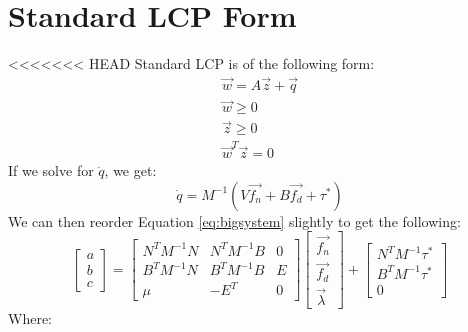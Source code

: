 \section{Standard LCP Form}
<<<<<<< HEAD
Standard LCP is of the following form:
\begin{equation}
\begin{array}{cc}
\vec{w} = A\vec{z} + \vec{q} \\
\vec{w} \geq 0 \\
\vec{z} \geq 0 \\
\vec{w}^T\vec{z} = 0
\end{array}
\end{equation}
If we solve for $\dot{q}$, we get:
\begin{equation}
\dot{q} = M^{-1}(V\vec{f_n} + B\vec{f_d} + \tau^*)
\end{equation}
We can then reorder Equation \ref{eq:bigsystem} slightly to get the following:
\begin{equation}
\label{eq:slcp0}
\left[\begin{matrix}a \\ b \\ c\end{matrix}\right] = \left[\begin{matrix}N^TM^{-1}N & N^TM^{-1}B & 0 \\ B^TM^{-1}N & B^TM^{-1}B & E \\ \mu & -E^T & 0\end{matrix}\right]\left[\begin{matrix}\vec{f_n} \\ \vec{f_d} \\ \vec{\lambda}\end{matrix}\right] + \left[\begin{matrix}N^TM^{-1}\tau^* \\ B^TM^{-1}\tau^* \\ 0\end{matrix}\right]
\end{equation}
Where:
